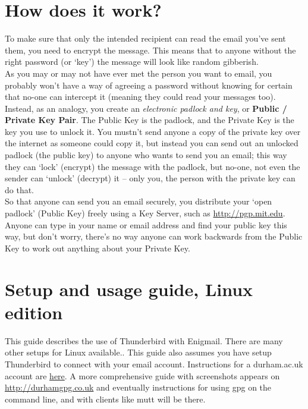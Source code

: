 \section{How does it work?}
To make sure that only the intended recipient can read the email you've sent them, you need to encrypt the message. This means that to anyone without the right password (or `key') the message will look like random gibberish. \\As you may or may not have ever met the person you want to email, you probably won't have a way of agreeing a password without knowing for certain that no-one can intercept it (meaning they could read your messages too). Instead, as an analogy, you create an \textit{electronic padlock and key}, or \textbf{Public / Private Key Pair}. The Public Key is the padlock, and the Private Key is the key you use to unlock it. You mustn't send anyone a copy of the private key over the internet as someone could copy it, but instead you can send out an unlocked padlock (the public key) to anyone who wants to send you an email; this way they can `lock' (encrypt) the message with the padlock, but no-one, not even the sender can `unlock' (decrypt) it -- only you, the person with the private key can do that.\\ So that anyone can send you an email securely, you distribute your `open padlock' (Public Key) freely using a Key Server, such as \href{http://pgp.mit.edu}{http://pgp.mit.edu}. Anyone can type in your name or email address and find your public key this way, but don't worry, there's no way anyone can work backwards from the Public Key to work out anything about your Private Key.

\section{Setup and usage guide, Linux edition}

This guide describes the use of Thunderbird with Enigmail. There are many other setups for Linux available.. This guide also assumes you have setup Thunderbird to connect with your email account. Instructions for a durham.ac.uk account are \href{http://www.dur.ac.uk/cis/email/exchange/eximap/configuring-clients/}{here}. A more comprehensive guide with screenshots appears on \href{http://durhamgpg.co.uk}{http://durhamgpg.co.uk} and eventually instructions for using gpg on the command line, and with clients like mutt will be there.


